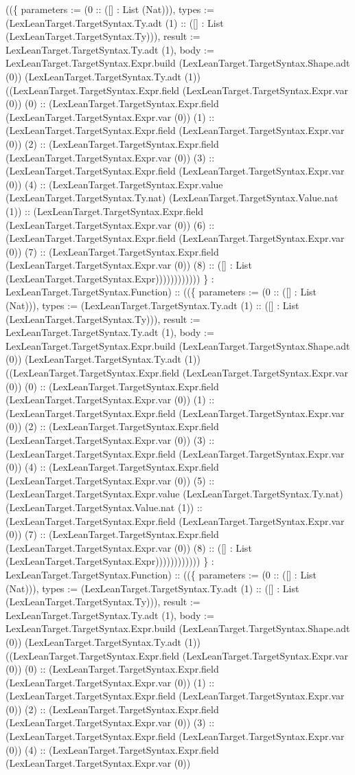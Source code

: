 \documentclass[11pt]{article}
\begin{document}
((\{ parameters := (0 :: ([] : List (Nat))), types := (LexLeanTarget.TargetSyntax.Ty.adt (1) :: ([] : List (LexLeanTarget.TargetSyntax.Ty))), result := LexLeanTarget.TargetSyntax.Ty.adt (1), body := LexLeanTarget.TargetSyntax.Expr.build (LexLeanTarget.TargetSyntax.Shape.adt (0)) (LexLeanTarget.TargetSyntax.Ty.adt (1)) ((LexLeanTarget.TargetSyntax.Expr.field (LexLeanTarget.TargetSyntax.Expr.var (0)) (0) :: (LexLeanTarget.TargetSyntax.Expr.field (LexLeanTarget.TargetSyntax.Expr.var (0)) (1) :: (LexLeanTarget.TargetSyntax.Expr.field (LexLeanTarget.TargetSyntax.Expr.var (0)) (2) :: (LexLeanTarget.TargetSyntax.Expr.field (LexLeanTarget.TargetSyntax.Expr.var (0)) (3) :: (LexLeanTarget.TargetSyntax.Expr.field (LexLeanTarget.TargetSyntax.Expr.var (0)) (4) :: (LexLeanTarget.TargetSyntax.Expr.value (LexLeanTarget.TargetSyntax.Ty.nat) (LexLeanTarget.TargetSyntax.Value.nat (1)) :: (LexLeanTarget.TargetSyntax.Expr.field (LexLeanTarget.TargetSyntax.Expr.var (0)) (6) :: (LexLeanTarget.TargetSyntax.Expr.field (LexLeanTarget.TargetSyntax.Expr.var (0)) (7) :: (LexLeanTarget.TargetSyntax.Expr.field (LexLeanTarget.TargetSyntax.Expr.var (0)) (8) :: ([] : List (LexLeanTarget.TargetSyntax.Expr)))))))))))) \} : LexLeanTarget.TargetSyntax.Function) :: ((\{ parameters := (0 :: ([] : List (Nat))), types := (LexLeanTarget.TargetSyntax.Ty.adt (1) :: ([] : List (LexLeanTarget.TargetSyntax.Ty))), result := LexLeanTarget.TargetSyntax.Ty.adt (1), body := LexLeanTarget.TargetSyntax.Expr.build (LexLeanTarget.TargetSyntax.Shape.adt (0)) (LexLeanTarget.TargetSyntax.Ty.adt (1)) ((LexLeanTarget.TargetSyntax.Expr.field (LexLeanTarget.TargetSyntax.Expr.var (0)) (0) :: (LexLeanTarget.TargetSyntax.Expr.field (LexLeanTarget.TargetSyntax.Expr.var (0)) (1) :: (LexLeanTarget.TargetSyntax.Expr.field (LexLeanTarget.TargetSyntax.Expr.var (0)) (2) :: (LexLeanTarget.TargetSyntax.Expr.field (LexLeanTarget.TargetSyntax.Expr.var (0)) (3) :: (LexLeanTarget.TargetSyntax.Expr.field (LexLeanTarget.TargetSyntax.Expr.var (0)) (4) :: (LexLeanTarget.TargetSyntax.Expr.field (LexLeanTarget.TargetSyntax.Expr.var (0)) (5) :: (LexLeanTarget.TargetSyntax.Expr.value (LexLeanTarget.TargetSyntax.Ty.nat) (LexLeanTarget.TargetSyntax.Value.nat (1)) :: (LexLeanTarget.TargetSyntax.Expr.field (LexLeanTarget.TargetSyntax.Expr.var (0)) (7) :: (LexLeanTarget.TargetSyntax.Expr.field (LexLeanTarget.TargetSyntax.Expr.var (0)) (8) :: ([] : List (LexLeanTarget.TargetSyntax.Expr)))))))))))) \} : LexLeanTarget.TargetSyntax.Function) :: ((\{ parameters := (0 :: ([] : List (Nat))), types := (LexLeanTarget.TargetSyntax.Ty.adt (1) :: ([] : List (LexLeanTarget.TargetSyntax.Ty))), result := LexLeanTarget.TargetSyntax.Ty.adt (1), body := LexLeanTarget.TargetSyntax.Expr.build (LexLeanTarget.TargetSyntax.Shape.adt (0)) (LexLeanTarget.TargetSyntax.Ty.adt (1)) ((LexLeanTarget.TargetSyntax.Expr.field (LexLeanTarget.TargetSyntax.Expr.var (0)) (0) :: (LexLeanTarget.TargetSyntax.Expr.field (LexLeanTarget.TargetSyntax.Expr.var (0)) (1) :: (LexLeanTarget.TargetSyntax.Expr.field (LexLeanTarget.TargetSyntax.Expr.var (0)) (2) :: (LexLeanTarget.TargetSyntax.Expr.field (LexLeanTarget.TargetSyntax.Expr.var (0)) (3) :: (LexLeanTarget.TargetSyntax.Expr.field (LexLeanTarget.TargetSyntax.Expr.var (0)) (4) :: (LexLeanTarget.TargetSyntax.Expr.field (LexLeanTarget.TargetSyntax.Expr.var (0)) 
\end{document}
